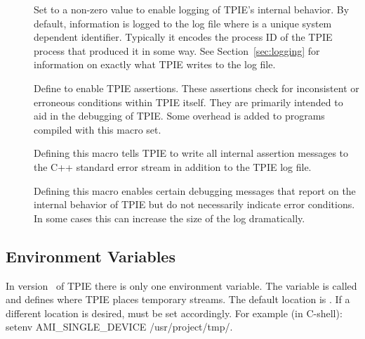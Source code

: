 \begin{description}
\item[{}] Set to a non-zero value to enable logging of
TPIE's internal behavior. By default,
information is logged to the log file 
where  is a unique system dependent identifier. Typically it
encodes the process ID of the TPIE process that produced it in some
way. See Section~\ref{sec:logging} for information on exactly what TPIE
writes to the log file.


\item[{}] Define to enable TPIE assertions. These
assertions check for inconsistent or erroneous conditions within TPIE
itself. They are primarily intended to aid in the debugging of TPIE. Some
overhead is added to programs compiled with this macro set.


\item[{}] Defining this macro tells TPIE to write all
internal assertion messages to the C++ standard error stream  in
addition to the TPIE log file.


\item[{}] Defining this macro enables certain debugging
messages that report on the internal behavior of TPIE but do not
necessarily indicate error conditions. In some cases this can increase the
size of the log dramatically.


\end{description}


\subsection{Environment Variables}
\label{sec:environment}

In version \version~of TPIE there is only one environment variable. The
variable is called  and defines where TPIE places
temporary streams. The default location is . If a different
location is desired,  must be set accordingly. For
example (in C-shell): setenv AMI\_SINGLE\_DEVICE /usr/project/tmp/.


